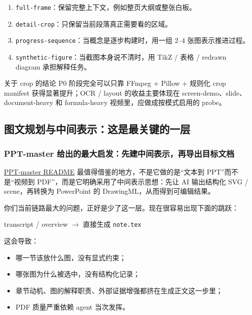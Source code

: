 \documentclass[a4paper]{article}
\begin{document}
\begin{enumerate}
\item \texttt{full-frame}：保留完整上下文，例如整页大纲或整张白板。
\item \texttt{detail-crop}：只保留当前段落真正需要看的区域。
\item \texttt{progress-sequence}：当概念是逐步构建时，用一组 2--4 张图表示推进过程。
\item \texttt{synthetic-figure}：当截图本身说不清时，用 TikZ / 表格 / redrawn diagram 承担解释任务。
\end{enumerate}

\begin{findingbox}{关于 crop 的结论}
P0 阶段完全可以只靠 FFmpeg + Pillow + 规则化 crop manifest 获得显著提升；OCR / layout 的收益主要体现在 screen-demo、slide、document-heavy 和 formula-heavy 视频里，应做成按模式启用的 probe。
\end{findingbox}

\subsection{图文规划与中间表示：这是最关键的一层}

\subsubsection{PPT-master 给出的最大启发：先建中间表示，再导出目标文档}

\href{https://raw.githubusercontent.com/hugohe3/ppt-master/main/README.md}{PPT-master README} 最值得借鉴的地方，不是它做的是“文本到 PPT”而不是“视频到 PDF”，而是它明确采用了中间表示思想：先让 AI 输出结构化 SVG / scene，再转换为 PowerPoint 的 DrawingML，从而得到可编辑结果。

你们当前链路最大的问题，正好是少了这一层。现在很容易出现下面的跳跃：

\begin{center}
transcript / overview $\rightarrow$ 直接生成 \texttt{note.tex}
\end{center}

这会导致：

\begin{itemize}
\item 哪一节该放什么图，没有显式约束；
\item 哪张图为什么被选中，没有结构化记录；
\item 章节动机、图的解释职责、外部证据增强都挤在生成正文这一步里；
\item PDF 质量严重依赖 agent 当次发挥。
\end{itemize}
\end{document}
